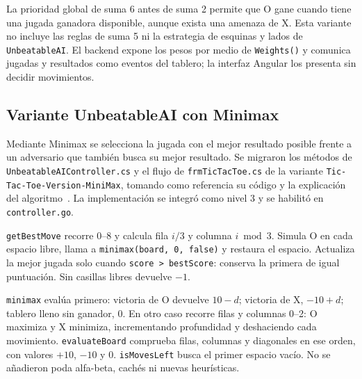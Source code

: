 \documentclass[12pt,a4paper]{article}
\begin{document}
La prioridad global de suma 6 antes de suma 2 permite que O gane cuando tiene
una jugada ganadora disponible, aunque exista una amenaza de X. Esta variante
no incluye las reglas de suma 5 ni la estrategia de esquinas y lados de
\texttt{UnbeatableAI}. El backend expone los pesos por medio de
\texttt{Weights()} y comunica jugadas y resultados como eventos del tablero;
la interfaz Angular los presenta sin decidir movimientos.

\subsection{Variante UnbeatableAI con Minimax}
Mediante Minimax se selecciona la jugada con el mejor resultado posible frente
a un adversario que también busca su mejor resultado. Se migraron los métodos de
\texttt{UnbeatableAIController.cs} y el flujo de \texttt{frmTicTacToe.cs} de la
variante \texttt{Tic-Tac-Toe-Version-MiniMax}, tomando como referencia su código
y la explicación del algoritmo~\cite{minimax-docente}. La implementación se
integró como nivel 3 y se habilitó en \texttt{controller.go}.

\texttt{getBestMove} recorre 0--8 y calcula fila $i/3$ y columna $i\bmod3$.
Simula O en cada espacio libre, llama a \texttt{minimax(board, 0, false)} y
restaura el espacio. Actualiza la mejor jugada solo cuando
\texttt{score > bestScore}: conserva la primera de igual puntuación.
Sin casillas libres devuelve $-1$.

\texttt{minimax} evalúa primero: victoria de O devuelve $10-d$; victoria de X,
$-10+d$; tablero lleno sin ganador, 0. En otro caso recorre filas y columnas
0--2: O maximiza y X minimiza, incrementando profundidad y deshaciendo cada
movimiento. \texttt{evaluateBoard} comprueba filas, columnas y diagonales en ese
orden, con valores $+10$, $-10$ y 0. \texttt{isMovesLeft} busca el primer espacio
vacío. No se añadieron poda alfa-beta, cachés ni nuevas heurísticas.
\end{document}
